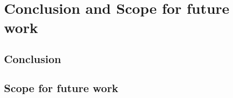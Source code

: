 \chapter{Conclusion and Scope for future work }

\section{Conclusion}
\lipsum[1-1]

\section{Scope for future work }
\lipsum[2-2]


